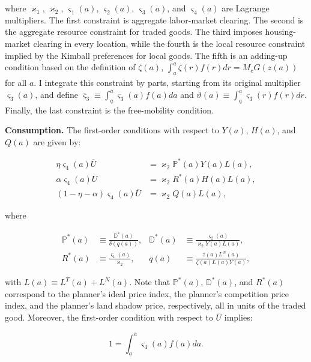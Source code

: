 where $\varkappa_1$, $\varkappa_2$, $\varsigma_1(a)$, $\varsigma_2(a)$, $\varsigma_3(a)$, and $\varsigma_4(a)$ are Lagrange multipliers. The first constraint is aggregate labor-market clearing. The second is the aggregate resource constraint for traded goods. The third imposes housing-market clearing in every location, while the fourth is the local resource constraint implied by the Kimball preferences for local goods. The fifth is an adding-up condition based on the definition of $\zeta(a)$, $\int_{\underline{a}}^{a} \zeta(r) f(r) dr =  M_e G(z(a))$ for all $a$. I integrate this constraint by parts, starting from its original multiplier $\varsigma_3(a)$, and define $\overline{\varsigma}_3 \equiv \int_{\underline{a}}^{\overline{a}} \varsigma_3(a) f(a) da$ and $\vartheta(a) \equiv \int_{\underline{a}}^a \varsigma_3(r) f(r) dr$. Finally, the last constraint is the free-mobility condition.

\noindent \textbf{Consumption.} The first-order conditions with respect to $Y(a)$, $H(a)$, and $Q(a)$ are given by:

\begin{align}
	\eta \varsigma_4(a) \overline{U}   & =  \varkappa_2 \mathbb{P}^*(a) Y(a) L(a), \label{eq:cplanner} \\
	\alpha \varsigma_4(a) \overline{U} & = \varkappa_2 R^*(a) H(a) L(a), \nonumber \\
	(1 - \eta - \alpha) \varsigma_4(a) \overline{U} & = \varkappa_2 Q(a) L(a), \nonumber
\end{align}

where

\begin{align*}
	\mathbb{P}^*(a) & \equiv \frac{\mathbb{D}^*(a)}{\delta(q(a))}, & \mathbb{D}^*(a) & \equiv \frac{\varsigma_2(a)}{\varkappa_2 Y(a)L(a)}, \\
	R^*(a)		& \equiv \frac{\varsigma_1(a)}{\varkappa_2}, & q(a) & \equiv  \frac{ z(a) L^{N}(a)}{\zeta(a) L(a) Y(a)},
\end{align*}

with $L(a) \equiv L^T(a) + L^{N}(a)$. Note that $\mathbb{P}^*(a)$, $\mathbb{D}^*(a)$, and $R^*(a)$ correspond to the planner's ideal price index, the planner's competition price index, and the planner's land shadow price, respectively, all in units of the traded good. Moreover, the first-order condition with respect to $\overline{U}$ implies:

\begin{equation}\label{eq:exUplann}
	1 = \int_{\underline{a}}^{\overline{a}} \varsigma_4(a) f(a) da.
\end{equation}

